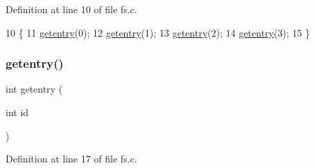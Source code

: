 Definition at line 10 of file fs.\+c.


\begin{DoxyCode}
10                   \{
11     \hyperlink{a00125_a3fb32d07d3bd05144a196c94fc59c0d1_a3fb32d07d3bd05144a196c94fc59c0d1}{getentry}(0);
12     \hyperlink{a00125_a3fb32d07d3bd05144a196c94fc59c0d1_a3fb32d07d3bd05144a196c94fc59c0d1}{getentry}(1);
13     \hyperlink{a00125_a3fb32d07d3bd05144a196c94fc59c0d1_a3fb32d07d3bd05144a196c94fc59c0d1}{getentry}(2);
14     \hyperlink{a00125_a3fb32d07d3bd05144a196c94fc59c0d1_a3fb32d07d3bd05144a196c94fc59c0d1}{getentry}(3);
15 \}
\end{DoxyCode}
\mbox{\label{a00125_a3fb32d07d3bd05144a196c94fc59c0d1_a3fb32d07d3bd05144a196c94fc59c0d1}} 
\subsubsection{\texorpdfstring{getentry()}{getentry()}}
{\footnotesize\ttfamily int getentry (\begin{DoxyParamCaption}\item[{int}]{id }\end{DoxyParamCaption})}



Definition at line 17 of file fs.\+c.


